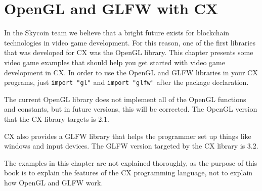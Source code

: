 \documentclass[11pt,fleqn,openany]{book} %
\begin{document}
\chapter{OpenGL and GLFW with CX}
\label{chapter:opengl-and-glfw-with-cx}


In the Skycoin team we believe that a bright future exists for blockchain technologies in video game development. For this reason, one of the first libraries that was developed for CX was the OpenGL library. This chapter presents some video game examples that should help you get started with video game development in CX. In order to use the OpenGL and GLFW libraries in your CX programs, just \lstinline{import "gl"} and \lstinline{import "glfw"} after the package declaration.

The current OpenGL library does not implement all of the OpenGL functions and constants, but in future versions, this will be corrected. The OpenGL version that the CX library targets is 2.1.

CX also provides a GLFW library that helps the programmer set up things like windows and input devices. The GLFW version targeted by the CX library is 3.2.

The examples in this chapter are not explained thoroughly, as the purpose of this book is to explain the features of the CX programming language, not to explain how OpenGL and GLFW work.
\end{document}
